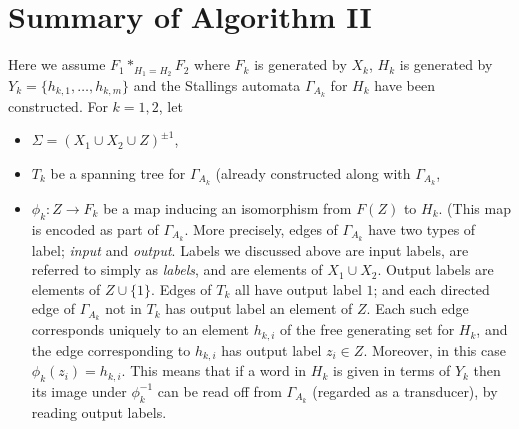\documentclass[a4paper,12pt]{article}
\newcommand{\G}{\Gamma }
\renewcommand{\S}{\Sigma }
\numberwithin{equation}{section}
\numberwithin{figure}{section}
\newcommand{\maps}{\rightarrow}
\newcommand{\biz}{\begin{itemize}}
\newcommand{\eiz}{\end{itemize}}
\begin{document}
\section{Summary of Algorithm II}
Here we assume $F_1*_{H_1=H_2} F_2$
 where $F_k$ is generated by $X_k$, $H_k$ is generated 
by $Y_k=\{h_{k,1},\ldots, h_{k,m}\}$ 
and the Stallings automata $\G_{A_k}$ for $H_k$ have
been constructed. For $k=1,2$,  let
\biz
\item $\S=(X_1\cup X_2\cup Z)^{\pm 1}$,
\item $T_k$ be a spanning tree for $\G_{A_k}$ (already constructed along
with $\G_{A_k}$,
\item $\phi_k:Z\maps F_k$ be a map inducing an isomorphism from $F(Z)$ to
$H_k$. (This map is encoded as part of $\G_{A_k}$. More precisely, 
edges of $\G_{A_k}$ have two types of label; \emph{input} and \emph{output}.
Labels we discussed above are input labels, are 
referred to simply as \emph{labels}, and are elements of $X_1\cup X_2$. 
Output labels are elements of  $Z\cup \{1\}$.
 Edges of $T_k$  all have output label $1$; and each directed 
edge of $\G_{A_k}$ not in $T_k$ has output 
label an element of $Z$. Each such edge corresponds uniquely to
 an element $h_{k,i}$ of the free generating set for $H_k$, and the edge
corresponding to $h_{k,i}$ has 
 output label  $z_i\in Z$. Moreover, in this case $\phi_k(z_i)=h_{k,i}$.  
  This means that if a word in $H_k$ is given in terms of $Y_k$  then its
image under $\phi_k^{-1}$ can be read off from $\G_{A_k}$ (regarded as a
 transducer), by reading output labels. 
\eiz
 
\end{document}
